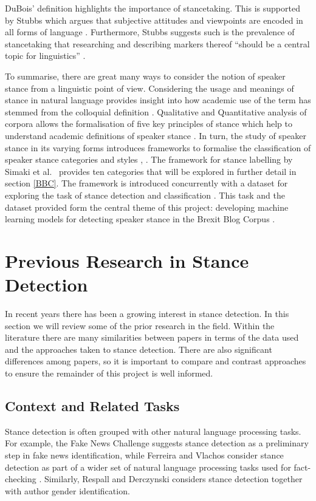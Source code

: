 \documentclass[Dissertation.tex]{subfiles}
\begin{document}
DuBois' \cite{duboisStanceTriangle2007} definition highlights the importance of stancetaking. This is supported by Stubbs  which argues that subjective attitudes and viewpoints are encoded in all forms of language \cite{stubbsMatterProlongedField1986}. Furthermore, Stubbs suggests such is the prevalence of stancetaking that researching and describing markers thereof ``should be  a  central
topic for linguistics'' \cite{stubbsMatterProlongedField1986}.

To summarise, there are great many ways to consider the notion of speaker stance from a linguistic point of view. Considering the usage and meanings of stance in natural language provides insight into how academic use of the term has stemmed from the colloquial definition \cite{barlowUsagebasedModelsLanguage2000}. Qualitative and Quantitative analysis of corpora allows the formalisation of five key principles of stance which help to understand academic definitions of speaker stance \cite{englebretsonStancetakingDiscourseSubjectivity2007}. In turn, the study of speaker stance in its varying forms introduces frameworks to formalise the classification of speaker stance categories and styles \cite{biberStylesStanceEnglish1989}, \cite{simakiAnnotatingSpeakerStance2017}. The framework for stance labelling by Simaki et al.\ \cite{simakiAnnotatingSpeakerStance2017} provides ten categories that will be explored in further detail in section \ref{BBC}. The framework is introduced concurrently with a dataset for exploring the task of stance detection and classification \cite{simakiAnnotatingSpeakerStance2017}. This task and the dataset provided form the central theme of this project: developing machine learning models for detecting speaker stance in the Brexit Blog Corpus \cite{simakiAnnotatingSpeakerStance2017}.

\section{Previous Research in Stance Detection} \label{sec:priorWork}
In recent years there has been a growing interest in stance detection. In this section we will review some of the prior research in the field. Within the literature there are many similarities between papers in terms of the data used and the approaches taken to stance detection. There are also significant differences among papers, so it is important to compare and contrast approaches to ensure the remainder of this project is well informed.

\subsection{Context and Related Tasks}
Stance detection is often grouped with other natural language processing tasks. For example, the Fake News Challenge suggests stance detection as a preliminary step in fake news identification, while Ferreira and Vlachos consider stance detection as part of a wider set of natural language processing tasks used for fact-checking \cite{ferreiraEmergentNovelDataset2016}. Similarly, Respall and Derczynski \cite{respallStanceDetectionCatalan} considers stance detection together with author gender identification.
\end{document}
